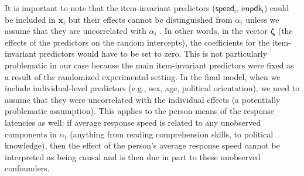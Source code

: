 \documentclass[Royal,times,sageh]{sagej}
\begin{document}
It is important to note that the item-invariant predictors
(\(\mathsf{speed_{i}}\), \(\mathsf{impdk_{i}}\)) could be included in
\(\bm{x}_{i}\) but their effects cannot be distinguished from
\(\alpha_{i}\) unless we assume that they are uncorrelated with
\(\alpha_{i}\) \citep[p.~488]{Wooldridge2002}. In other words, in the
vector \(\bm{\zeta}\) (the effects of the predictors on the random
intercepts), the coefficients for the item-invariant predictors would
have to be set to zero. This is not particularly problematic in our case
because the main item-invariant predictors were fixed as a result of the
randomized experimental setting. In the final model, when we include
individual-level predictors (e.g., sex, age, political orientation), we
need to assume that they were uncorrelated with the individual effects
(a potentially problematic assumption). This applies to the person-means
of the response latencies as well: if average response speed is related
to any unobserved components in \(\alpha_{i}\) (anything from reading
comprehension skills, to political knowledge), then the effect of the
person's average response speed cannot be interpreted as being causal
and is then due in part to these unobserved confounders.



\end{document}
